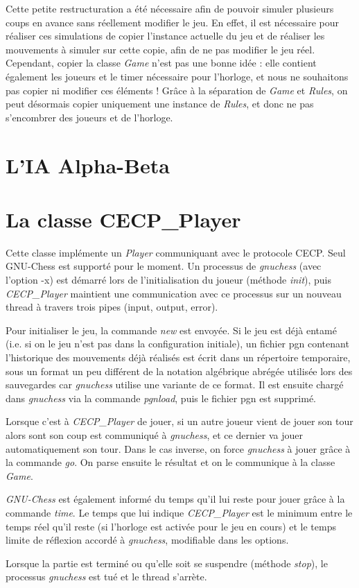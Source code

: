 \documentclass[11pt]{article}
\begin{document}
\-

Cette petite restructuration a été nécessaire afin de pouvoir simuler plusieurs coups en avance sans réellement modifier le jeu.
En effet, il est nécessaire pour réaliser ces simulations de copier l'instance actuelle du jeu et de réaliser les mouvements à simuler sur cette copie, afin de ne pas modifier le jeu réel. Cependant, copier la classe \textit{Game} n'est pas une bonne idée :
elle contient également les joueurs et le timer nécessaire pour l'horloge, et nous ne souhaitons pas copier ni modifier ces éléments !
Grâce à la séparation de \textit{Game} et \textit{Rules}, on peut désormais copier uniquement une instance de \textit{Rules}, et donc ne pas s'encombrer des joueurs et de l'horloge.

\section{L'IA Alpha-Beta}


\section{La classe CECP\_Player}
Cette classe implémente un \textit{Player} communiquant avec le protocole CECP. Seul GNU-Chess est supporté pour le moment.
Un processus de \textsl{gnuchess} (avec l'option -x) est démarré lors de l'initialisation du joueur (méthode \textit{init}),
puis \textit{CECP\_Player} maintient une communication avec ce processus sur un nouveau thread à travers trois pipes (input, output, error).

\-

Pour initialiser le jeu, la commande \textit{new} est envoyée. Si le jeu est déjà entamé (i.e. si on le jeu n'est pas dans la configuration initiale), un fichier pgn contenant l'historique des mouvements déjà réalisés est écrit dans un répertoire temporaire,
sous un format un peu différent de la notation algébrique abrégée utilisée lors des sauvegardes car \textit{gnuchess} utilise une variante de ce format. Il est ensuite chargé dans \textit{gnuchess} via la commande \textit{pgnload}, puis le fichier pgn est supprimé.

\-

Lorsque c'est à \textit{CECP\_Player} de jouer, si un autre joueur vient de jouer son tour alors sont son coup est communiqué à \textit{gnuchess}, et ce dernier va jouer automatiquement son tour. Dans le cas inverse, on force \textit{gnuchess} à jouer grâce à la commande \textit{go}. On parse ensuite le résultat et on le communique à la classe \textit{Game}.

\-

\textit{GNU-Chess} est également informé du temps qu'il lui reste pour jouer grâce à la commande \textit{time}. Le temps que lui indique \textit{CECP\_Player} est le minimum entre le temps réel qu'il reste (si l'horloge est activée pour le jeu en cours) et le temps limite de réflexion accordé à \textit{gnuchess}, modifiable dans les options.

\-

Lorsque la partie est terminé ou qu'elle soit se suspendre (méthode \textit{stop}), le processus \textit{gnuchess} est tué et le thread
s'arrète.

\-
\end{document}
